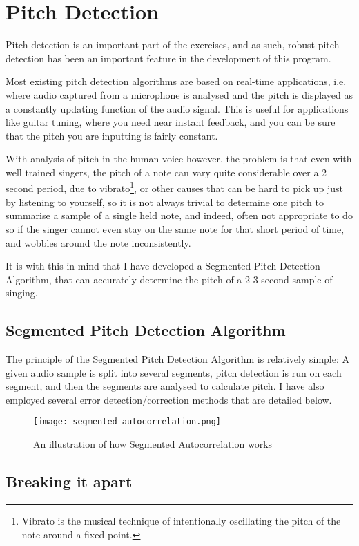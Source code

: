 \section{Pitch Detection}
\par Pitch detection is an important part of the exercises, and as such, robust pitch detection has been an important feature in the development of this program. 
\par Most existing pitch detection algorithms are based on real-time applications, i.e. where audio captured from a microphone is analysed and the pitch is displayed as a constantly updating function of the audio signal. This is useful for applications like guitar tuning, where you need near instant feedback, and you can be sure that the pitch you are inputting is fairly constant. 
\par With analysis of pitch in the human voice however, the problem is that even with well trained singers, the pitch of a note can vary quite considerable over a 2 second period, due to vibrato\footnote{Vibrato is the musical technique of intentionally oscillating the pitch of the note around a fixed point.}, or other causes that can be hard to pick up just by listening to yourself, so it is not always trivial to determine one pitch to summarise a sample of a single held note, and indeed, often not appropriate to do so if the singer cannot even stay on the same note for that short period of time, and wobbles around the note inconsistently.
\par It is with this in mind that I have developed a Segmented Pitch Detection Algorithm, that can accurately determine the pitch of a 2-3 second sample of singing.

\subsection{Segmented Pitch Detection Algorithm}
The principle of the Segmented Pitch Detection Algorithm is relatively simple: A given audio sample is split into several segments, pitch detection is run on each segment, and then the segments are analysed to calculate pitch. I have also employed several error detection/correction methods that are detailed below.
\begin{figure}
	\centering
	\texttt{[image: segmented\_autocorrelation.png]}
	\caption{An illustration of how Segmented Autocorrelation works}
\end{figure}

\subsection{Breaking it apart}


